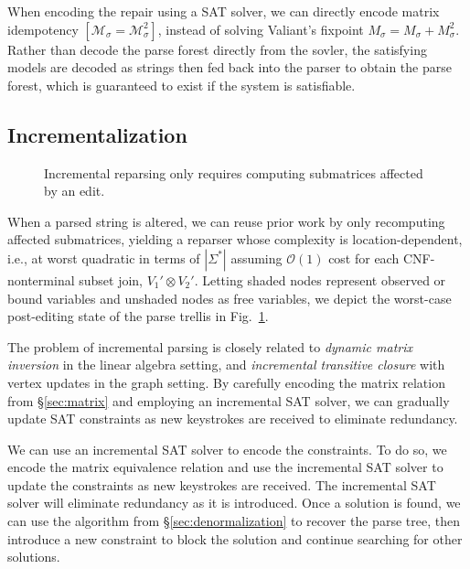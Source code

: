 \documentclass[sigplan,review,anonymous,acmsmall]{acmart}\settopmatter{printfolios=false,printccs=false,printacmref=false}
\begin{document}
When encoding the repair using a SAT solver, we can directly encode matrix idempotency $[\mathcal{M}_\sigma=\mathcal{M}_\sigma^2]$, instead of solving Valiant's fixpoint $M_\sigma = M_\sigma + M^2_\sigma$. Rather than decode the parse forest directly from the sovler, the satisfying models are decoded as strings then fed back into the parser to obtain the parse forest, which is guaranteed to exist if the system is satisfiable.

\pagebreak\subsection{Incrementalization}\label{sec:incrementalization}

\begin{figure}
  \vspace{-13pt}
  \resizebox{.4\textwidth}{!}{}
  \caption{Incremental reparsing only requires computing submatrices affected by an edit.}
  \label{fig:incremental}
\end{figure}

When a parsed string is altered, we can reuse prior work by only recomputing affected submatrices, yielding a reparser whose complexity is location-dependent, i.e., at worst quadratic in terms of $|\Sigma^*|$ assuming $\mathcal{O}(1)$ cost for each CNF-nonterminal subset join, $V_1'\otimes V_2'$. Letting shaded nodes represent observed or bound variables and unshaded nodes as free variables, we depict the worst-case post-editing state of the parse trellis in Fig.~\ref{fig:incremental}.

The problem of incremental parsing is closely related to \textit{dynamic matrix inversion} in the linear algebra setting, and \textit{incremental transitive closure} with vertex updates in the graph setting. By carefully encoding the matrix relation from \S\ref{sec:matrix} and employing an incremental SAT solver, we can gradually update SAT constraints as new keystrokes are received to eliminate redundancy.

We can use an incremental SAT solver to encode the constraints. To do so, we encode the matrix equivalence relation and use the incremental SAT solver to update the constraints as new keystrokes are received. The incremental SAT solver will eliminate redundancy as it is introduced. Once a solution is found, we can use the algorithm from \S\ref{sec:denormalization} to recover the parse tree, then introduce a new constraint to block the solution and continue searching for other solutions.
\end{document}
